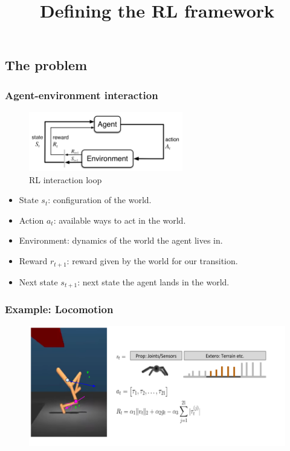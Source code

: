 

\subsection{The problem} \title{Defining the RL framework} \author{} \date{}
\begin{frame}[plain,c]
    \titlepage
\end{frame}

\begin{frame}
    \frametitle{Agent-environment interaction}
    \begin{figure}
        \centering
        \includegraphics[width=0.6\textwidth]{./imgs/img_rl_loop.png}
        \caption{RL interaction loop \cite{RLbook}}
    \end{figure}

    \pause

    \begin{itemize}
        \item State $s_{t}$: configuration of the world. \pause
        \item Action $a_{t}$: available ways to act in the world. \pause
        \item Environment: dynamics of the world the agent lives in. \pause
        \item Reward $r_{t+1}$: reward given by the world for our transition. \pause
        \item Next state $s_{t+1}$: next state the agent lands in the world.
    \end{itemize}
\end{frame}

\begin{frame}
    \frametitle{Example: Locomotion}
    \begin{figure}
        \centering
        \includegraphics[width=\textwidth]{./imgs/img_rl_mdp_locomotion.png}
    \end{figure}
\end{frame}

